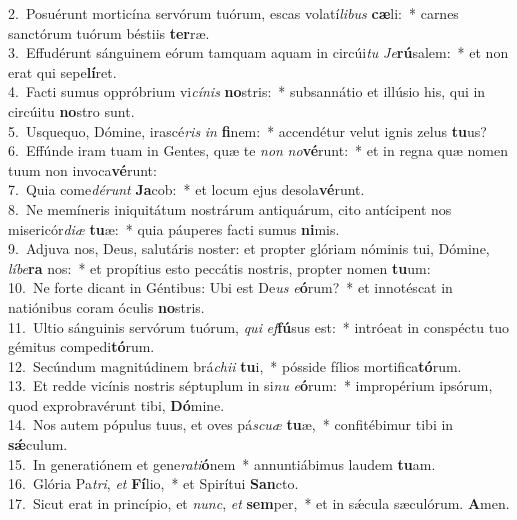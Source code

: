 {2.~}Posuérunt morticína servórum tuórum, escas volatí\textit{li}\textit{bus} \textbf{cæ}li:~* carnes sanctórum tuórum béstiis \textbf{ter}ræ.\\
{3.~}Effudérunt sánguinem eórum tamquam aquam in circúi\textit{tu} \textit{Je}\textbf{rú}salem:~* et non erat qui sepe\textbf{lí}ret.\\
{4.~}Facti sumus oppróbrium vi\textit{cí}\textit{nis} \textbf{no}stris:~* subsannátio et illúsio his, qui in circúitu \textbf{no}stro sunt.\\
{5.~}Usquequo, Dómine, irascé\textit{ris} \textit{in} \textbf{fi}nem:~* accendétur velut ignis zelus \textbf{tu}us?\\
{6.~}Effúnde iram tuam in Gentes, quæ te \textit{non} \textit{no}\textbf{vé}runt:~* et in regna quæ nomen tuum non invoca\textbf{vé}runt:\\
{7.~}Quia come\textit{dé}\textit{runt} \textbf{Ja}cob:~* et locum ejus desola\textbf{vé}runt.\\
{8.~}Ne memíneris iniquitátum nostrárum antiquárum, cito antícipent nos misericór\textit{di}\textit{æ} \textbf{tu}æ:~* quia páuperes facti sumus \textbf{ni}mis.\\
{9.~}Adjuva nos, Deus, salutáris noster: et propter glóriam nóminis tui, Dómine, \textit{lí}\textit{be}\textbf{ra} nos:~* et propítius esto peccátis nostris, propter nomen \textbf{tu}um:\\
{10.~}Ne forte dicant in Géntibus: Ubi est De\textit{us} \textit{e}\textbf{ó}rum?~* et innotéscat in natiónibus coram óculis \textbf{no}stris.\\
{11.~}Ultio sánguinis servórum tuórum, \textit{qui} \textit{ef}\textbf{fú}sus est:~* intróeat in conspéctu tuo gémitus compedi\textbf{tó}rum.\\
{12.~}Secúndum magnitúdinem brá\textit{chi}\textit{i} \textbf{tu}i,~* pósside fílios mortifica\textbf{tó}rum.\\
{13.~}Et redde vicínis nostris séptuplum in si\textit{nu} \textit{e}\textbf{ó}rum:~* impropérium ipsórum, quod exprobravérunt tibi, \textbf{Dó}mine.\\
{14.~}Nos autem pópulus tuus, et oves pá\textit{scu}\textit{æ} \textbf{tu}æ,~* confitébimur tibi in \textbf{sǽ}culum.\\
{15.~}In generatiónem et gene\textit{ra}\textit{ti}\textbf{ó}nem~* annuntiábimus laudem \textbf{tu}am.\\
{16.~}Glória Pa\textit{tri}, \textit{et} \textbf{Fí}lio,~* et Spirítui \textbf{San}cto.\\
{17.~}Sicut erat in princípio, et \textit{nunc}, \textit{et} \textbf{sem}per,~* et in sǽcula sæculórum. \textbf{A}men.\\
